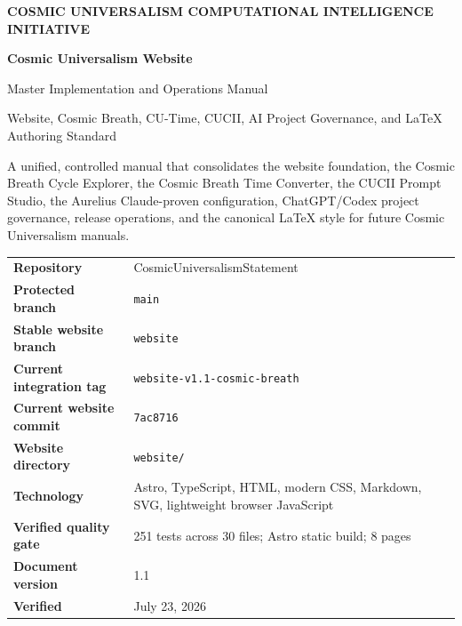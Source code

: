 \documentclass[11pt,letterpaper]{article}
\newcommand{\ProjectTitle}{Cosmic Universalism Website}
\newcommand{\DocumentTitle}{Master Implementation and Operations Manual}
\newcommand{\DocumentSubtitle}{Website, Cosmic Breath, CU-Time, CUCII, AI Project Governance, and LaTeX Authoring Standard}
\newcommand{\RepositoryName}{CosmicUniversalismStatement}
\newcommand{\ProtectedBranch}{main}
\newcommand{\StableBranch}{website}
\newcommand{\WebsiteDirectory}{website/}
\newcommand{\CurrentIntegrationTag}{website-v1.1-cosmic-breath}
\newcommand{\CurrentIntegrationCommit}{7ac8716}
\newcommand{\DocumentVersion}{1.1}
\newcommand{\VerificationDate}{July 23, 2026}
\begin{document}
\hypersetup{pageanchor=false}

\begin{titlepage}
\pagecolor{CUNavy}
\color{white}
\thispagestyle{empty}

\vspace*{0.55in}

{\small\bfseries\color{CUCyanLight}
COSMIC UNIVERSALISM COMPUTATIONAL INTELLIGENCE INITIATIVE}

\vspace{0.38in}

{\Huge\bfseries
\ProjectTitle}

\vspace{0.16in}

{\LARGE\color{CUGoldLight}
\DocumentTitle}

\vspace{0.12in}

{\large\color{CUBlueLight}
\DocumentSubtitle}

\vspace{0.34in}

{\large
A unified, controlled manual that consolidates the website foundation, the
Cosmic Breath Cycle Explorer, the Cosmic Breath Time Converter, the CUCII
Prompt Studio, the Aurelius Claude-proven configuration, ChatGPT/Codex project
governance, release operations, and the canonical LaTeX style for future
Cosmic Universalism manuals.}

\vfill

\begin{tcolorbox}[
    colback=CUNavyTwo, colframe=CUBlue, boxrule=0.8pt, arc=2mm,
    width=\textwidth
]
\color{white}
\begin{tabularx}{\textwidth}{>{\bfseries}L{1.75in}Y}
Repository & \RepositoryName \\
Protected branch & \texttt{\ProtectedBranch} \\
Stable website branch & \texttt{\StableBranch} \\
Current integration tag & \texttt{\CurrentIntegrationTag} \\
Current website commit & \texttt{\CurrentIntegrationCommit} \\
Website directory & \texttt{\WebsiteDirectory} \\
Technology & Astro, TypeScript, HTML, modern CSS, Markdown, SVG, lightweight browser JavaScript \\
Verified quality gate & 251 tests across 30 files; Astro static build; 8 pages \\
Document version & \DocumentVersion \\
Verified & \VerificationDate \\
\end{tabularx}
\end{tcolorbox}


\end{titlepage}
\end{document}
